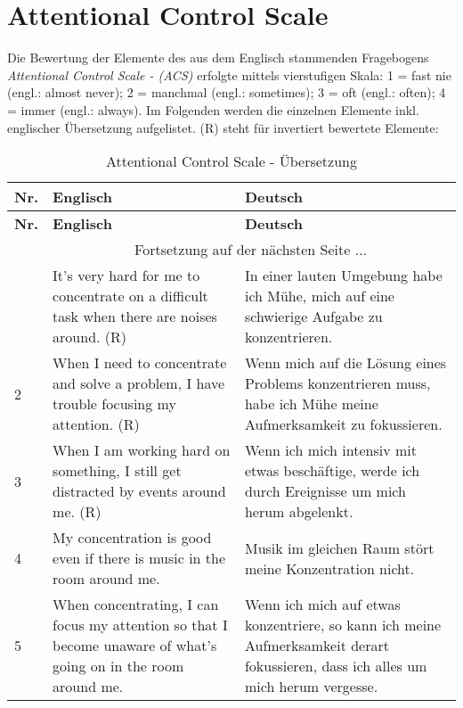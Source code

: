 \section{Attentional Control Scale}\label{appendix.acs}
Die Bewertung der Elemente des aus dem Englisch stammenden Fragebogens \textit{Attentional Control Scale - (ACS)} \cite{Derryberry:2002} erfolgte mittels vierstufigen Skala: 1 = fast nie (engl.: almost never); 2 = manchmal (engl.: sometimes); 3 = oft (engl.: often); 4 = immer (engl.: always).\newline
Im Folgenden werden die einzelnen Elemente inkl. englischer Übersetzung aufgelistet. (R) steht für invertiert bewertete Elemente:
\begin{center}
    \begin{longtable}[t]{|l|p{6.6 cm}|p{6.6 cm}|}
    \caption{Attentional Control Scale - Übersetzung} \\ \hline
        \textbf{Nr.} & \textbf{Englisch} & \textbf{Deutsch} \\ \hline
        \endfirsthead
        \hline
        \textbf{Nr.} & \textbf{Englisch} & \textbf{Deutsch} \\ \hline
        \endhead 
        & \multicolumn{2}{|c|}{Fortsetzung auf der nächsten Seite $...$ } \\ \hline
        \endfoot
        \hline
        \endlastfoot
        1 & It’s very hard for me to concentrate on a difficult task when there are noises around. (R) & In einer lauten Umgebung habe ich Mühe, mich auf eine schwierige Aufgabe zu konzentrieren.\\ 
        2 & When I need to concentrate and solve a problem, I have trouble focusing my attention. (R) & Wenn mich auf die Lösung eines Problems konzentrieren muss, habe ich Mühe meine Aufmerksamkeit zu fokussieren.\\ 
        3 & When I am working hard on something, I still get distracted by events around me. (R) & Wenn ich mich intensiv mit etwas beschäftige, werde ich durch Ereignisse um mich herum abgelenkt.\\ 
        4 & My concentration is good even if there is music in the room around me. & Musik im gleichen Raum stört meine Konzentration nicht.\\
        5 & When concentrating, I can focus my attention so that I become unaware of what’s going on in the room around me. & Wenn ich mich auf etwas konzentriere,  so kann ich meine Aufmerksamkeit derart fokussieren, dass ich alles um mich herum vergesse. \\

\end{longtable}
\end{center}
